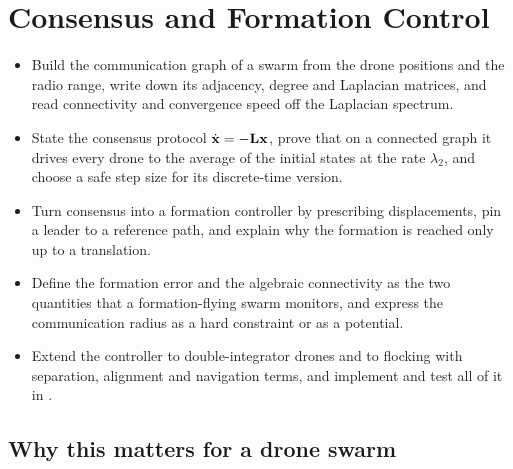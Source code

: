 \chapter{Consensus and Formation Control}
\label{ch:ch23}

\begin{objectives}
\begin{itemize}
  \item Build the communication graph of a swarm from the drone positions and the radio range, write down its adjacency, degree and Laplacian matrices, and read connectivity and convergence speed off the Laplacian spectrum.
  \item State the consensus protocol $\dot{\mathbf{x}} = -\mathbf{L}\mathbf{x}$, prove that on a connected graph it drives every drone to the average of the initial states at the rate $\lambda_2$, and choose a safe step size for its discrete-time version.
  \item Turn consensus into a formation controller by prescribing displacements, pin a leader to a reference path, and explain why the formation is reached only up to a translation.
  \item Define the formation error and the algebraic connectivity as the two quantities that a formation-flying swarm monitors, and express the communication radius as a hard constraint or as a potential.
  \item Extend the controller to double-integrator drones and to flocking with separation, alignment and navigation terms, and implement and test all of it in \python.
\end{itemize}
\end{objectives}

\section{Why this matters for a drone swarm}
\label{sec:ch23-motivation}

